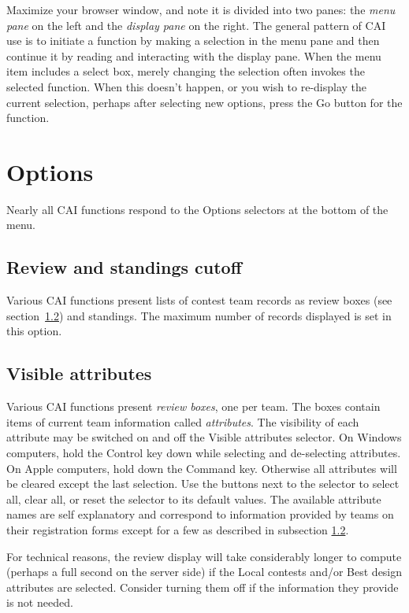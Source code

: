 \documentclass[11pt,letterpaper]{refart}
\def\ui#1{\textsf{#1}}
\begin{document}
Maximize your browser window, and note it is divided into two panes: the \emph{menu pane}
on the left and the \emph{display pane} on the right. The general pattern of CAI use is
to initiate a function by making a selection in the menu pane and then continue it
by reading and interacting with the display pane. When the menu item includes
a select box, merely changing the selection often invokes the selected function.
When this doesn't happen, or you wish to re-display the current selection, perhaps 
after selecting new options, press the  \ui{Go} button for the function.

\section{Options}
Nearly all CAI functions respond to the \ui{Options} selectors 
at the bottom of the menu. 

\subsection{Review and standings cutoff}
Various CAI functions present lists of contest team records as review boxes 
(see section~\ref{sec:reviewboxes}) and 
standings. The maximum number of records displayed is set in this option.
 
\subsection{Visible attributes}
\label{sec:reviewboxes}
Various CAI functions present \emph{review boxes}, one per team. The boxes
contain items of current team information called \emph{attributes}. 
The visibility of each attribute may be switched on and off the 
\ui{Visible attributes} selector. On Windows computers, 
hold the Control key down while selecting and de-selecting attributes. On Apple
computers, hold down the Command key. Otherwise
all attributes will be cleared except the last selection. Use the buttons next to 
the selector to select all, clear all, or reset the selector to its default values. The
available attribute names are self explanatory and correspond to information
provided by teams on their registration forms except for a few as described
in subsection \ref{sec:reviewboxes}.

For technical reasons, the review display will take considerably longer to compute
(perhaps a full second on the server side) if the \ui{Local contests}  and/or 
\ui{Best design} attributes are selected. Consider turning them off if the
information they provide is not needed.
\end{document}
